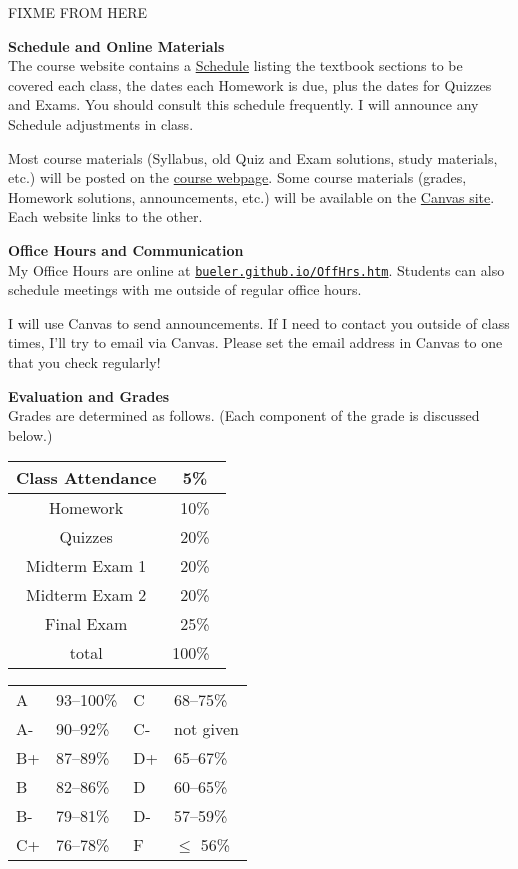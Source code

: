 \documentclass[12pt]{article}
\renewcommand{\emph}[1]{\textsf{\textbf{#1}}}
\newcommand{\localhead}[1]{\par\smallskip\textbf{#1} \smallskip\nobreak\\}%
\def\heading#1{\localhead{\large\emph{#1}}}
\begin{document}
FIXME FROM HERE

\heading{Schedule and Online Materials}
The course website contains a \href{https://bueler.github.io/calc2/schedule.pdf}{Schedule} listing the textbook sections to be covered each class, the dates each Homework is due, plus the dates for Quizzes and Exams. You should consult this schedule frequently.  I will announce any Schedule adjustments in class.

Most course materials (Syllabus, old Quiz and Exam solutions, study materials, etc.) will be posted on the \href{https://bueler.github.io/calc2/}{course webpage}.  Some course materials (grades, Homework solutions, announcements, etc.) will be available on the \href{https://canvas.alaska.edu/courses/7049}{Canvas site}.  Each website links to the other.


\heading{Office Hours and Communication}
My Office Hours are online at \href{http://bueler.github.io/OffHrs.htm}{\texttt{bueler.github.io/OffHrs.htm}}.  Students can also schedule meetings with me outside of regular office hours. 

I will use Canvas to send announcements.  If I need to contact you outside of class times, I'll try to email via Canvas.  Please set the email address in Canvas to one that you check regularly!


\heading{Evaluation and Grades}
Grades are determined as follows.  (Each component of the grade is discussed below.)
 
\begin{multicols}{2}
\begin{tabular}{|c|c|}
\hline
Class Attendance & 5\%\\
\hline
Homework & 10\% \\
\hline
Quizzes & 20\% \\
\hline
Midterm Exam 1 & 20\% \\
\hline
Midterm Exam 2 & 20\%  \\
\hline
Final Exam & 25\% \\
\hline
total & 100\% \, \\
\hline
\end{tabular}


\begin{tabular}{llll}
A  & 93--100\%& C  & 68--75\%  \\
A- & 90--92\% & C- & not given \\
B+ & 87--89\% & D+ & 65--67\%  \\
B  & 82--86\% & D  & 60--65\%  \\
B- & 79--81\% & D- & 57--59\%  \\
C+ & 76--78\% & F  & $\le$ 56\%
\end{tabular}
\end{multicols}
\end{document}

